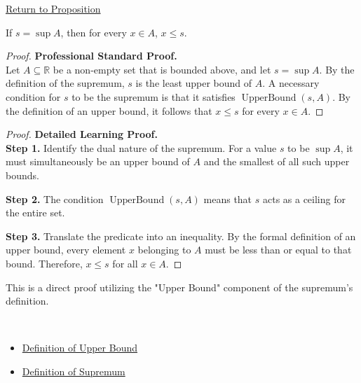 \newpage
{}
\label{prf:every-element-lies-below-the-supremum}

\begin{remark*}[Return]
\hyperref[prop:every-element-lies-below-the-supremum]{Return to Proposition}
\end{remark*}

\begin{theorem*}
If $s = \sup A$, then for every $x \in A$, $x \le s$.
\end{theorem*}

\begin{proof}
\textbf{Professional Standard Proof.}~\\
Let $A \subseteq \mathbb{R}$ be a non-empty set that is bounded above, and let $s = \sup A$. By the definition of the supremum, $s$ is the least upper bound of $A$. A necessary condition for $s$ to be the supremum is that it satisfies $\operatorname{UpperBound}(s, A)$. By the definition of an upper bound, it follows that $x \le s$ for every $x \in A$.
\end{proof}

\begin{proof}
\textbf{Detailed Learning Proof.}~\\

\textbf{Step 1.} Identify the dual nature of the supremum. For a value $s$ to be $\sup A$, it must simultaneously be an upper bound of $A$ and the smallest of all such upper bounds.

\textbf{Step 2.} The condition $\operatorname{UpperBound}(s, A)$ means that $s$ acts as a ceiling for the entire set.

\textbf{Step 3.} Translate the predicate into an inequality. By the formal definition of an upper bound, every element $x$ belonging to $A$ must be less than or equal to that bound. Therefore, $x \le s$ for all $x \in A$.
\end{proof}

\begin{remark*}
This is a direct proof utilizing the "Upper Bound" component of the supremum's definition.
\end{remark*}

\begin{remark*}[Dependencies]~\\
\begin{itemize}
  \item \hyperref[def:upper-bound]{Definition of Upper Bound}
  \item \hyperref[def:supremum]{Definition of Supremum}
\end{itemize}
\end{remark*}